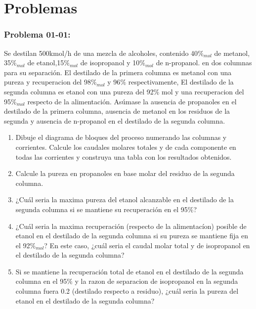 \documentclass{report}
\begin{document}
\section{Problemas}
\begin{raggedright}
	\subsubsection{\textbf{Problema 01-01:} }
	Se destilan 500kmol/h de una mezcla de alcoholes, contenido 40$\% _{mol}$ de metanol, 35$\% _{mol}$ de etanol,15$\% _{mol}$ de isopropanol y 10$\% _{mol}$ de n-propanol.
		en dos columnas para su separación. El destilado de la primera columna es metanol con una pureza y recuperacion del 98$\% _{mol}$ y 96$\%$ respectivamente, 
		El destilado de la segunda columna es etanol con una pureza del 92$\%$ mol y una recuperacion del 95$\% _{mol}$ respecto de la alimentación. Asúmase la ausencia de propanoles en el destilado de la primera columna, ausencia de metanol en los residuos de la segunda y ausencia de n-propanol en el destilado de la segunda columna.
	\begin{enumerate}[label=\textbf{\alph*)}]
		\item Dibuje el diagrama de bloques del proceso numerando las columnas y corrientes. Calcule los caudales molares totales y de cada componente en todas las corrientes y construya una tabla con los resultados obtenidos.
		\item Calcule la pureza en propanoles en base molar del residuo de la segunda columna.
		\item ¿Cuál seria la maxima pureza del etanol alcanzable en el destilado de la segunda columna si se mantiene su recuperación en el 95$\%$?
		\item ¿Cuál seria la maxima recuperación (respecto de la alimentacíon) posible de etanol en el destilado de la segunda columna si su pureza se mantiene fija en el 92$\% _{mol}$? En este caso, ¿cuál seria el caudal molar total y de isopropanol en el destilado de la segunda columna?
		\item Si se mantiene la recuperación total de etanol en el destilado de la segunda columna en el 95$\%$ y la razon de separacion de isopropanol en la segunda columna fuera 0.2 (destilado respecto a residuo), ¿cuál seria la pureza del etanol en el destilado de la segunda columna?
	\end{enumerate}
\sol


\end{raggedright}
\end{document}
